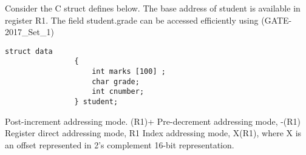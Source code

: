 \begin{questyle}
  \question  Consider the C struct defines below. The base address of student is available in
             register R1. The field student.grade can be accessed efficiently using  (GATE-2017\_Set\_1)
             \begin{lstlisting}[style=mystyle]
                struct data
                {
                    int marks [100] ;
                    char grade;
                    int cnumber;
                } student;
             \end{lstlisting}

  \begin{choices}
    \choice         Post-increment addressing mode. (R1)+
    \choice         Pre-decrement addressing mode, -(R1)
    \choice         Register direct addressing mode, R1
    \CorrectChoice  Index addressing mode, X(R1), where X is an offset represented in 2’s complement 16-bit representation.
  \end{choices}
\end{questyle}

